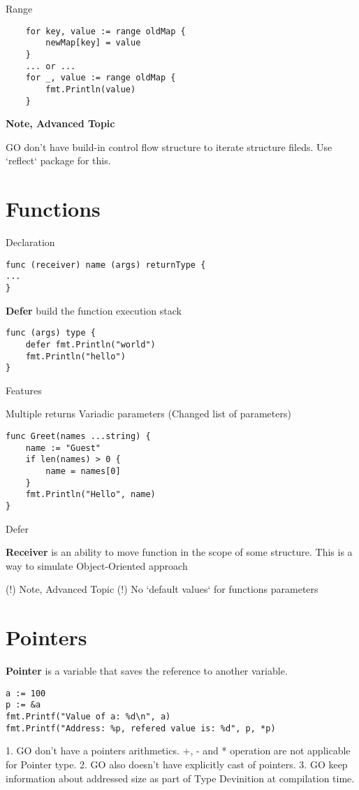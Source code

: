\documentclass[12pt]{article}
\begin{document}
\begin{multicols}{2}
    Range
    \begin{lstlisting}
    for key, value := range oldMap {
        newMap[key] = value
    }
    ... or ...
    for _, value := range oldMap {
        fmt.Println(value)
    }
    \end{lstlisting}

    \begin{Note}
    \textbf{Note, Advanced Topic}

    GO don't have build-in control flow structure to iterate structure fileds.
    Use `reflect` package for this.
    \end{Note}
\end{multicols}

\newpage
\section{Functions}

Declaration
\begin{lstlisting}
func (receiver) name (args) returnType {
...
}
\end{lstlisting}

\textbf{Defer} build the function execution stack
\begin{lstlisting}
func (args) type {
    defer fmt.Println("world")
    fmt.Println("hello")
}
\end{lstlisting}

Features

Multiple returns
Variadic parameters (Changed list of parameters)
\begin{lstlisting}
func Greet(names ...string) {
    name := "Guest"
    if len(names) > 0 {
        name = names[0]
    }
    fmt.Println("Hello", name)
}
\end{lstlisting}
Defer

\textbf{Receiver} is an ability to move function in the scope of some structure.
This is a way to simulate Object-Oriented approach

(!) Note, Advanced Topic (!)
No `default values` for functions parameters


\newpage
\section{Pointers}
\textbf{Pointer} is a variable that saves the reference to another variable.

\begin{paracol}{2} \begin{leftcolumn}
\begin{lstlisting}
a := 100
p := &a
fmt.Printf("Value of a: %d\n", a)
fmt.Printf("Address: %p, refered value is: %d", p, *p)
\end{lstlisting}
\end{leftcolumn} \begin{rightcolumn}
1. GO don't have a pointers arithmetics. +, - and * operation are not applicable
for Pointer type.
2. GO also doesn't have explicitly cast of pointers.
3. GO keep information about addressed size as part of Type Devinition at
compilation time.

\end{rightcolumn}
\end{paracol}
\end{document}
